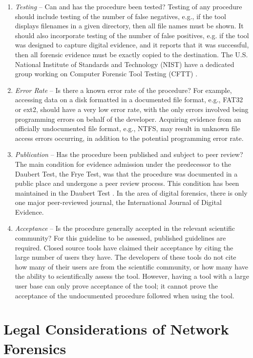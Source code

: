 \documentclass[runningheads,a4paper]{llncs}
\begin{document}
\begin{enumerate}
\item \emph{Testing} -- Can and has the procedure been tested? Testing of any procedure should include testing of the number of false negatives, e.g., if the tool displays filenames in a given directory, then all file names must be shown. It should also incorporate testing of the number of false positives, e.g. if the tool was designed to capture digital evidence, and it reports that it was successful, then all forensic evidence must be exactly copied to the destination. The U.S. National Institute of Standards and Technology (NIST) have a dedicated group working on Computer Forensic Tool Testing (CFTT) \cite{cftt}.
\item \emph{Error Rate} -- Is there a known error rate of the procedure? For example, accessing data on a disk formatted in a documented file format, e.g., FAT32 or ext2, should have a very low error rate, with the only errors involved being programming errors on behalf of the developer. Acquiring evidence from an officially undocumented file format, e.g., NTFS, may result in unknown file access errors occurring, in addition to the potential programming error rate.
\item \emph{Publication} -- Has the procedure been published and subject to peer review? The main condition for evidence admission under the predecessor to the Daubert Test, the Frye Test, was that the procedure was documented in a public place and undergone a peer review process. This condition has been maintained in the Daubert Test \cite{carrier-open}. In the area of digital forensics, there is only one major peer-reviewed journal, the International Journal of Digital Evidence.
\item \emph{Acceptance} -- Is the procedure generally accepted in the relevant scientific community? For this guideline to be assessed, published guidelines are required. Closed source tools have claimed their acceptance by citing the large number of users they have. The developers of these tools do not cite how many of their users are from the scientific community, or how many have the ability to scientifically assess the tool. However, having a tool with a large user base can only prove acceptance of the tool; it cannot prove the acceptance of the undocumented procedure followed when using the tool.
\end{enumerate}



\section{Legal Considerations of Network Forensics}
\label{legal}
\end{document}

